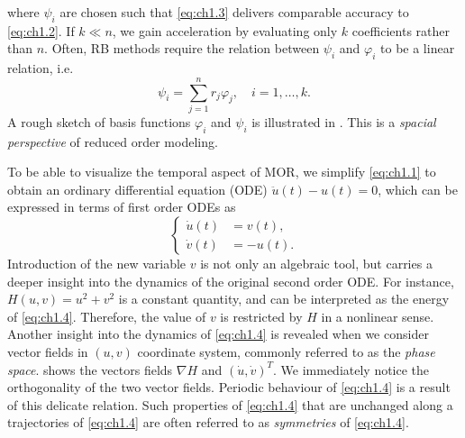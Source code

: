 where $\psi_i$ are chosen such that \eqref{eq:ch1.3} delivers comparable accuracy to \eqref{eq:ch1.2}. If $k \ll n$, we gain acceleration by evaluating only $k$ coefficients rather than $n$. Often, RB methods require the relation between $\psi_i$ and $\varphi_i$ to be a linear relation, i.e.
\begin{equation} \label{eq:ch1.3.1}
	\psi_i = \sum_{j=1}^n r_j \varphi_j, \quad i=1,\dots,k.
\end{equation}
A rough sketch of basis functions $\varphi_i$ and $\psi_i$ is illustrated in . This is a \emph{spacial perspective} of reduced order modeling.

To be able to visualize the temporal aspect of MOR, we simplify \eqref{eq:ch1.1} to obtain an ordinary differential equation (ODE) $\ddot u(t) - u(t) = 0$, which can be expressed in terms of first order ODEs as
\begin{equation} \label{eq:ch1.4}
	\left\{
	\begin{aligned}
		\dot u(t) &= v(t), \\
		\dot v(t) &= -u(t).
	\end{aligned}
	\right.
\end{equation}
Introduction of the new variable $v$ is not only an algebraic tool, but carries a deeper insight into the dynamics of the original second order ODE. For instance, $H(u,v) = u^2 + v^2$ is a constant quantity, and can be interpreted as the energy of \eqref{eq:ch1.4}. Therefore, the value of $v$ is restricted by $H$ in a nonlinear sense. Another insight into the dynamics of \eqref{eq:ch1.4} is revealed when we consider vector fields in $(u,v)$ coordinate system, commonly referred to as the \emph{phase space}.  shows the vectors fields $\nabla H$ and $(\dot u, \dot v)^T$. We immediately notice the orthogonality of the two vector fields. Periodic behaviour of \eqref{eq:ch1.4} is a result of this delicate relation. Such properties of \eqref{eq:ch1.4} that are unchanged along a trajectories of \eqref{eq:ch1.4} are often referred to as \emph{symmetries} of \eqref{eq:ch1.4}.
